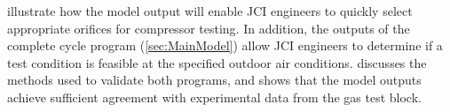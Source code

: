  illustrate how the model output will
enable JCI engineers to quickly select appropriate orifices for compressor testing.
In addition, the outputs of the complete cycle program (\cref{sec:MainModel})
allow JCI engineers to determine if a test condition is feasible at the specified
outdoor air conditions.
 discusses the methods used to validate both programs, and shows
that the model outputs achieve sufficient agreement with experimental data from the 
 gas test block.